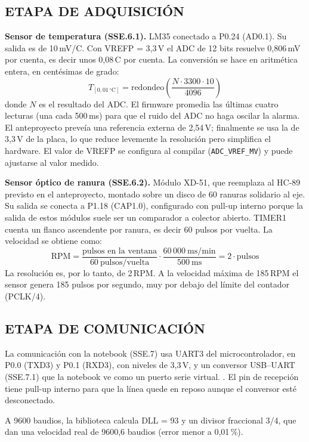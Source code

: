 \subsection{ETAPA DE ADQUISICIÓN}

\textbf{Sensor de temperatura (SSE.6.1).} LM35 conectado a P0.24 (AD0.1). Su salida es de
10\,mV/\textdegree C. Con VREFP = 3,3\,V el ADC de 12 bits resuelve 0,806\,mV por cuenta,
es decir unos 0,08\,\textdegree C por cuenta. La conversión se hace en aritmética entera,
en centésimas de grado:
\[
T_{[0{,}01\,^\circ\mathrm{C}]} = \mathrm{redondeo}\!\left(\frac{N \cdot 3300 \cdot 10}{4096}\right)
\]
donde $N$ es el resultado del ADC. El firmware promedia las últimas cuatro lecturas (una
cada 500\,ms) para que el ruido del ADC no haga oscilar la alarma. El anteproyecto preveía
una referencia externa de 2,54\,V; finalmente se usa la de 3,3\,V de la placa, lo que reduce
levemente la resolución pero simplifica el hardware. El valor de VREFP se configura al
compilar (\texttt{ADC\_VREF\_MV}) y puede ajustarse al valor medido.

\textbf{Sensor óptico de ranura (SSE.6.2).} Módulo XD-51, que reemplaza al HC-89 previsto
en el anteproyecto, montado sobre un disco de 60 ranuras solidario al eje. Su salida se
conecta a P1.18 (CAP1.0), configurado con pull-up interno porque la salida de estos
módulos suele ser un comparador a colector abierto. TIMER1 cuenta un flanco ascendente por
ranura, es decir 60 pulsos por vuelta. La velocidad se obtiene como:
\[
\mathrm{RPM} = \frac{\text{pulsos en la ventana}}{60\ \text{pulsos/vuelta}} \cdot
\frac{60\,000\ \mathrm{ms/min}}{500\ \mathrm{ms}} = 2 \cdot \text{pulsos}
\]
La resolución es, por lo tanto, de 2\,RPM. A la velocidad máxima de 185\,RPM el sensor
genera 185 pulsos por segundo, muy por debajo del límite del contador (PCLK/4).

\subsection{ETAPA DE COMUNICACIÓN}

La comunicación con la notebook (SSE.7) usa UART3 del microcontrolador, en P0.0 (TXD3) y
P0.1 (RXD3), con niveles de 3,3\,V, y un conversor USB--UART (SSE.7.1) que la notebook ve
como un puerto serie virtual. . El pin de recepción tiene
pull-up interno para que la línea quede en reposo aunque el conversor esté desconectado.

A 9600 baudios, la biblioteca calcula DLL = 93 y un divisor fraccional 3/4, que dan una
velocidad real de 9600,6 baudios (error menor a 0,01\,\%).
